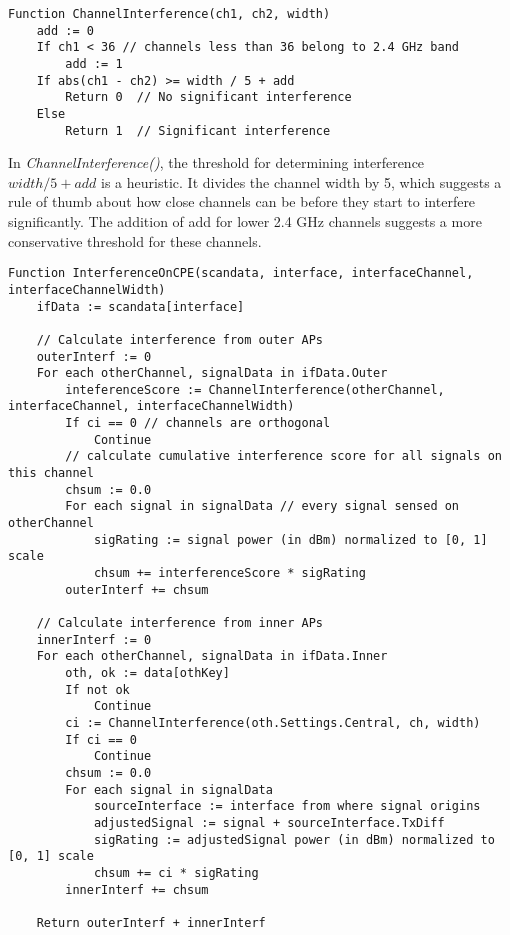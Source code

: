 \begin{lstlisting}[language={Pseudo}, caption=ChannelInterference() function., label=lst:channel_interf]
Function ChannelInterference(ch1, ch2, width)
    add := 0
    If ch1 < 36 // channels less than 36 belong to 2.4 GHz band
        add := 1
    If abs(ch1 - ch2) >= width / 5 + add
        Return 0  // No significant interference
    Else
        Return 1  // Significant interference
\end{lstlisting}
In \textit{ChannelInterference()}, the threshold for determining interference $width/5+add$ is a heuristic. It divides the channel width by 5, which suggests a rule of thumb about how close channels can be before they start to interfere significantly. The addition of add for lower 2.4 GHz channels suggests a more conservative threshold for these channels.

\begin{lstlisting}[language={Pseudo}, caption=OnIfaceInterference() function., label=lst:interf_on_cpe]
Function InterferenceOnCPE(scandata, interface, interfaceChannel, interfaceChannelWidth)
    ifData := scandata[interface]

    // Calculate interference from outer APs
    outerInterf := 0
    For each otherChannel, signalData in ifData.Outer
        inteferenceScore := ChannelInterference(otherChannel, interfaceChannel, interfaceChannelWidth)
        If ci == 0 // channels are orthogonal
            Continue
        // calculate cumulative interference score for all signals on this channel
        chsum := 0.0
        For each signal in signalData // every signal sensed on otherChannel
            sigRating := signal power (in dBm) normalized to [0, 1] scale
            chsum += interferenceScore * sigRating
        outerInterf += chsum

    // Calculate interference from inner APs
    innerInterf := 0
    For each otherChannel, signalData in ifData.Inner
        oth, ok := data[othKey]
        If not ok
            Continue
        ci := ChannelInterference(oth.Settings.Central, ch, width)
        If ci == 0
            Continue
        chsum := 0.0
        For each signal in signalData
            sourceInterface := interface from where signal origins
            adjustedSignal := signal + sourceInterface.TxDiff
            sigRating := adjustedSignal power (in dBm) normalized to [0, 1] scale
            chsum += ci * sigRating
        innerInterf += chsum

    Return outerInterf + innerInterf
\end{lstlisting}

